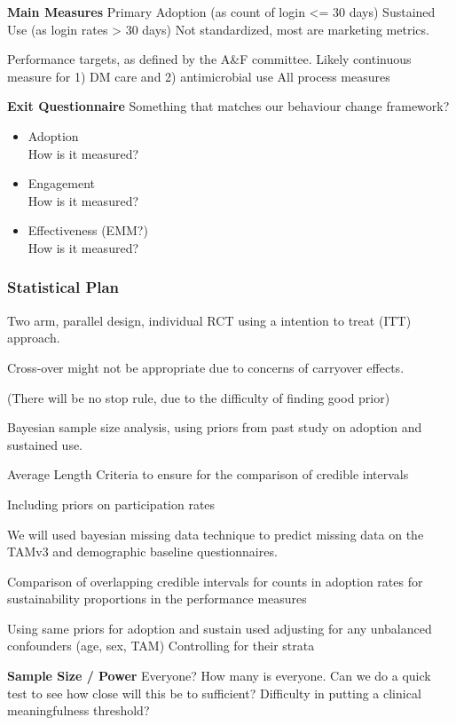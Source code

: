 \textbf{Main Measures}
Primary
Adoption (as count of login <= 30 days)
Sustained Use (as login rates > 30 days)
Not standardized, most are marketing metrics.

Performance targets, as defined by the A\&F committee.
Likely continuous measure for 1) DM care and 2) antimicrobial use
All process measures

\textbf{Exit Questionnaire}
Something that matches our behaviour change framework?


\begin{itemize}
    \item Adoption \\ How is it measured?
    \item Engagement \\ How is it measured?
    \item Effectiveness (EMM?) \\ How is it measured?
\end{itemize}

\subsubsection{Statistical Plan}

Two arm, parallel design, individual RCT using a intention to treat (ITT) approach.

Cross-over might not be appropriate due to concerns of carryover effects.

(There will be no stop rule, due to the difficulty of finding good prior)

Bayesian sample size analysis, using priors from past study on adoption and sustained use.

Average Length Criteria to ensure for the comparison of credible intervals

Including priors on participation rates

We will used bayesian missing data technique to predict missing data on the TAMv3 and demographic baseline questionnaires.

Comparison of overlapping credible intervals for 
	counts in adoption 
	rates for sustainability
	proportions in the performance measures

Using same priors for adoption and sustain used
adjusting for any unbalanced confounders (age, sex, TAM)
Controlling for their strata



\textbf{Sample Size / Power}
Everyone? How many is everyone. Can we do a quick test to see how close will this be to sufficient?
Difficulty in putting a clinical meaningfulness threshold?

